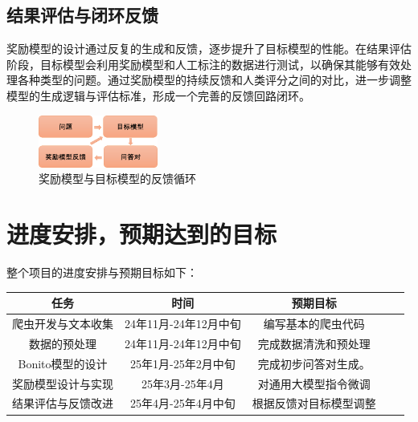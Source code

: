 \subsection{结果评估与闭环反馈}
奖励模型的设计通过反复的生成和反馈，逐步提升了目标模型的性能\cite{pmlr-v202-longpre23a}。在结果评估阶段，目标模型会利用奖励模型和人工标注的数据进行测试，以确保其能够有效处理各种类型的问题。通过奖励模型的持续反馈和人类评分之间的对比，进一步调整模型的生成逻辑与评估标准，形成一个完善的反馈回路闭环。
\begin{figure}[htbp]
    \centering
    \includegraphics[width=0.35\textwidth]{./img/pre.png}
    \caption{奖励模型与目标模型的反馈循环}\label{fig:feedback_loop}
\end{figure}

\section{进度安排，预期达到的目标}
整个项目的进度安排与预期目标如下：
\begin{table}[htbp]
    \vspace{0.5em}\centering\wuhao
    \begin{tabular}{ccccc}
        \toprule
        任务          & 时间              & 预期目标        \\
        \midrule
        爬虫开发与文本收集   & 24年11月-24年12月中旬 & 编写基本的爬虫代码   \\
        数据的预处理      & 24年11月-24年12月中旬 & 完成数据清洗和预处理  \\
        Bonito模型的设计 & 25年1月-25年2月中旬   & 完成初步问答对生成。  \\
        奖励模型设计与实现   & 25年3月-25年4月     & 对通用大模型指令微调  \\
        结果评估与反馈改进   & 25年4月-25年4月中旬   & 根据反馈对目标模型调整 \\
        \bottomrule
    \end{tabular}
\end{table}

